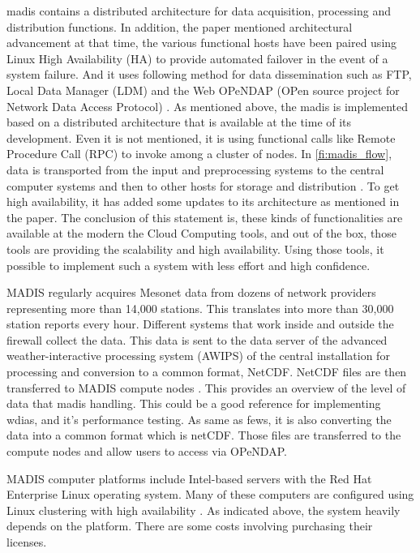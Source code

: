 \acrshort{madis} contains a distributed architecture for data acquisition, processing and distribution functions.
In addition, the paper mentioned architectural advancement at that time, the various functional hosts have been paired using Linux High Availability (HA) to provide automated failover in the event of a system failure. And it uses following method for data dissemination such as FTP, Local Data Manager (LDM) and the Web OPeNDAP (OPen source project for Network Data Access Protocol) \cite{Macdermaid2005ARCHITECTUREP2.39}. As mentioned above, the \acrshort{madis} is implemented based on a distributed architecture that is available at the time of its development. Even it is not mentioned, it is using functional calls like Remote Procedure Call (RPC) to invoke among a cluster of nodes. In \cref{fi:madis_flow}, data is transported from the input and preprocessing systems to the central computer systems and then to other hosts for storage and distribution \cite{Macdermaid2005ARCHITECTUREP2.39}. To get high availability, it has added some updates to its architecture as mentioned in the paper. The conclusion of this statement is, these kinds of functionalities are available at the modern the Cloud Computing tools, and out of the box, those tools are providing the scalability and high availability. Using those tools, it possible to implement such a system with less effort and high confidence.

MADIS regularly acquires Mesonet data from dozens of network providers representing more than 14,000 stations. This translates into more than 30,000 station reports every hour. Different systems that work inside and outside the firewall collect the data. This data is sent to the data server of the advanced weather-interactive processing system (AWIPS) of the central installation for processing and conversion to a common format, NetCDF. NetCDF files are then transferred to MADIS compute nodes \cite{Macdermaid2005ARCHITECTUREP2.39}. This provides an overview of the level of data that \acrshort{madis} handling. This could be a good reference for implementing \acrshort{wdias}, and it's performance testing. As same as \acrshort{fews}, it is also converting the data into a common format which is \acrshort{netCDF}. Those files are transferred to the compute nodes and allow users to access via OPeNDAP.

MADIS computer platforms include Intel-based servers with the Red Hat Enterprise Linux operating system. Many of these computers are configured using Linux clustering with high availability \cite{Macdermaid2005ARCHITECTUREP2.39}. As indicated above, the system heavily depends on the platform. There are some costs involving purchasing their licenses.

